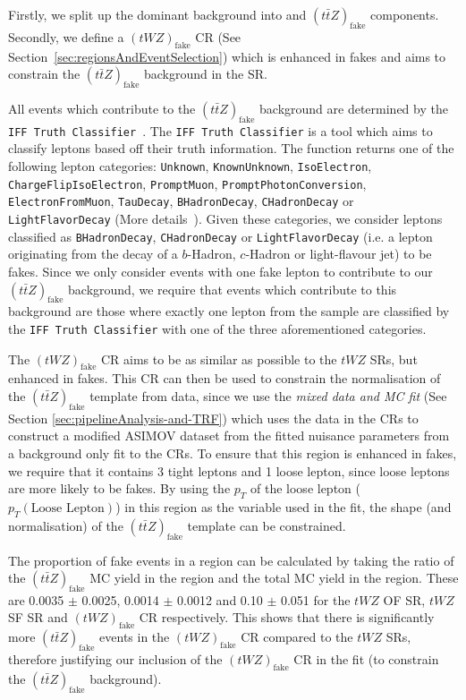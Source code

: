 Firstly, we split up the dominant \ttZ background into \ttZ and $(t\bar{t}Z)_{\text{fake}}$ components. Secondly, we define a $(tWZ)_{\text{fake}}$ CR (See Section~\ref{sec:regionsAndEventSelection}) which is enhanced in fakes and aims to constrain the $(t\bar{t}Z)_{\text{fake}}$ background in the SR.

 All events which contribute to the $(t\bar{t}Z)_{\text{fake}}$ background are determined by the \texttt{IFF Truth Classifier}~\cite{IFFTruthClassifier}. The \texttt{IFF Truth Classifier} is a tool which aims to classify leptons based off their truth information. The function returns one of the following lepton categories: \texttt{Unknown}, \texttt{KnownUnknown}, \texttt{IsoElectron}, \texttt{ChargeFlipIsoElectron}, \texttt{PromptMuon}, \texttt{PromptPhotonConversion}, \texttt{ElectronFromMuon}, \texttt{TauDecay}, \texttt{BHadronDecay}, \texttt{CHadronDecay} or \texttt{LightFlavorDecay} (More details~\cite{IFFTruthClassifier-leptonCategories}). Given these categories, we consider leptons classified as \texttt{BHadronDecay}, \texttt{CHadronDecay} or \texttt{LightFlavorDecay} (i.e. a lepton originating from the decay of a $b$-Hadron, $c$-Hadron or light-flavour jet) to be fakes. Since we only consider events with one fake lepton to contribute to our $(t\bar{t}Z)_{\text{fake}}$ background, we require that events which contribute to this background are those where exactly one lepton from the \ttZ sample are classified by the \texttt{IFF Truth Classifier} with one of the three aforementioned categories.

The $(tWZ)_{\text{fake}}$ CR aims to be as similar as possible to the $tWZ$ SRs, but enhanced in fakes. This CR can then be used to constrain the normalisation of the $(t\bar{t}Z)_{\text{fake}}$ template from data, since we use the \textit{mixed data and MC fit} (See Section \ref{sec:pipelineAnalysis-and-TRF}) which uses the data in the CRs to construct a modified ASIMOV dataset from the fitted nuisance parameters from a background only fit to the CRs. To ensure that this region is enhanced in fakes, we require that it contains 3 tight leptons and 1 loose lepton, since loose leptons are more likely to be fakes. By using the $p_{T}$ of the loose lepton ($p_{T}(\text{Loose Lepton})$) in this region as the variable used in the fit, the shape (and normalisation) of the $(t\bar{t}Z)_{\text{fake}}$ template can be constrained.

The proportion of fake events in a region can be calculated by taking the ratio of the $(t\bar{t}Z)_{\text{fake}}$ MC yield in the region and the total MC yield in the region. These are 0.0035 $\pm$ 0.0025, 0.0014 $\pm$ 0.0012 and 0.10 $\pm$ 0.051 for the $tWZ$ OF SR, $tWZ$ SF SR and $(tWZ)_{\text{fake}}$ CR respectively. This shows that there is significantly more $(t\bar{t}Z)_{\text{fake}}$ events in the $(tWZ)_{\text{fake}}$ CR compared to the $tWZ$ SRs, therefore justifying our inclusion of the $(tWZ)_{\text{fake}}$ CR in the fit (to constrain the $(t\bar{t}Z)_{\text{fake}}$ background).

